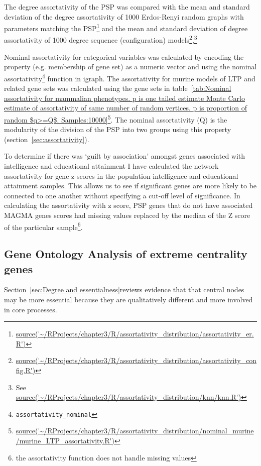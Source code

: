 The degree assortativity of the PSP was compared with the mean and standard deviation of the degree assortativity of 1000 Erdos-Renyi random graphs with parameters matching the PSP\footnote{\url{source('~/RProjects/chapter3/R/assortativity_distribution/assortativity_er.R')}} and the mean and standard deviation of degree assortativity of 1000 degree sequence (configuration) models\footnote{\url{source('~/RProjects/chapter3/R/assortativity_distribution/assortativity_config.R')}},\footnote{See \url{source('~/RProjects/chapter3/R/assortativity_distribution/knn/knn.R')}}

Nominal assortativity for categorical variables was calculated by encoding the property (e.g. membership of gene set) as a numeric vector and using the nominal assortativity\footnote{\texttt{assortativity\_nominal}} function in igraph. The assortativity for murine models of LTP and related gene sets was calculated using the gene sets in table~\ref{tab:Nominal assortativity for mammalian phenotypes. p is one tailed estimate Monte Carlo estimate of assortativity of same number of random vertices. p is proportion of random $q>=Q$. Samples:10000}\footnote{\url{source('~/RProjects/chapter3/R/assortativity_distribution/nominal_murine/murine_LTP_assortativity.R')}}. The nominal assortativity (Q) is the modularity of the division of the PSP into two groups using this property (section~\ref{sec:assortativity}).

To determine if there was `guilt by association' amongst genes associated with intelligence and educational attainment I have calculated the network assortativity  for  gene z-scores in the population intelligence and educational attainment samples. This allows us to see if significant genes are more likely to be connected to one another without  specifying a cut-off level of significance. In calculating the assortativity with z score, PSP genes that do not have associated MAGMA genes scores had missing values  replaced by the median of the Z score of  the particular sample\footnote{the assortativity function does not handle missing values}.


\subsection{Gene Ontology Analysis of extreme centrality genes}
\label{sec:Methods gene ontology centrality}

Section~\ref{sec:Degree and essentialness}reviews evidence that that central nodes may be more essential because they are qualitatively different and more involved in core processes. 

